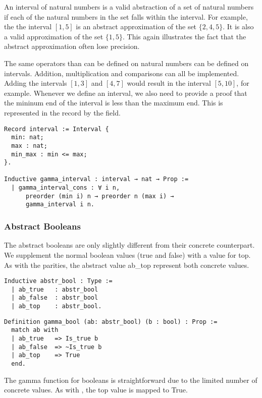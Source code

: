 An interval of natural numbers is a valid abstraction of a set of natural
numbers if each of the natural numbers in the set falls within the interval.
For example, the the interval $[1,5]$ is an abstract approximation of the set
$\{2, 4, 5\}$. It is also a valid approximation of the set $\{1,5\}$. This
again illustrates the fact that the abstract approximation often lose 
precision.

The same operators than can be defined on natural numbers can be defined on
intervals. Addition, multiplication and comparisons can all be implemented.
Adding the intervals $[1,3]$ and $[4, 7]$ would result in the interval $[5,
10]$, for example. Whenever we define an interval, we also need to provide a
proof that the mininum end of the interval is less than the maximum end. This
is represented in the record by the  field.

\begin{listing}
\begin{verbatim}
Record interval := Interval {
  min: nat;
  max : nat;
  min_max : min <= max;
}.

Inductive gamma_interval : interval → nat → Prop :=
  | gamma_interval_cons : ∀ i n, 
      preorder (min i) n → preorder n (max i) →
      gamma_interval i n.
\end{verbatim}
\end{listing}

\subsubsection{Abstract Booleans}
The abstract booleans are only slightly different from their concrete
counterpart. We supplement the normal boolean values (true and false) with
a value for top. As with the parities, the abstract value ab\_top
represent both concrete values.

\begin{verbatim}
Inductive abstr_bool : Type :=
  | ab_true   : abstr_bool
  | ab_false  : abstr_bool
  | ab_top    : abstr_bool.
\end{verbatim}

\begin{verbatim}
Definition gamma_bool (ab: abstr_bool) (b : bool) : Prop :=
  match ab with
  | ab_true   => Is_true b
  | ab_false  => ~Is_true b
  | ab_top    => True
  end.
\end{verbatim}

The gamma function for booleans is straightforward due to the limited
number of concrete values. As with , the top 
value is mapped to True.

